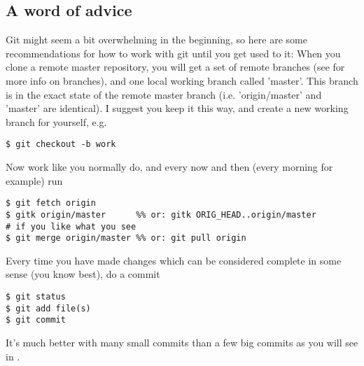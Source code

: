 \documentclass[a4paper,10pt]{article}
\begin{document}
\subsection{A word of advice}
Git might seem a bit overwhelming in the beginning, so here are
some recommendations for how to work with git until you get used to it:
When you clone a remote master repository, you will get a set of remote
branches (see  for more info on branches), and one
local working branch called 'master'. This branch is in the exact state of
the remote master branch (i.e. 'origin/master' and 'master' are identical). I
suggest you keep it this way, and create a new working branch for yourself, 
e.g. 
\begin{verbatim}
$ git checkout -b work 
\end{verbatim}
Now work like you normally do, and every now and then (every morning for
example) run
\begin{verbatim}
$ git fetch origin
$ gitk origin/master      %% or: gitk ORIG_HEAD..origin/master
# if you like what you see
$ git merge origin/master %% or: git pull origin
\end{verbatim}
Every time you have made changes which can be considered complete in some
sense (you know best), do a commit 
\begin{verbatim}
$ git status
$ git add file(s)
$ git commit 
\end{verbatim}
It's much better with many small commits
than a few big commits as you will see in .
\end{document}
